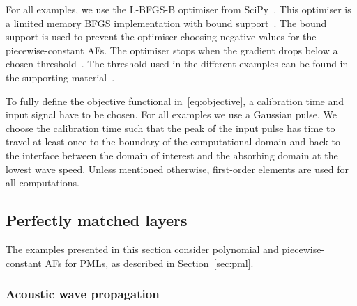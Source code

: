 \documentclass[a4paper]{article}
\begin{document}
For all examples, we use the L-BFGS-B optimiser from
SciPy~\citep{scipy}. This optimiser is a limited memory BFGS
implementation with bound support~\citep{byrd95etall}. The bound
support is used to prevent the optimiser choosing negative values for
the piecewise-constant AFs. The optimiser stops when the gradient
drops below a chosen threshold~\citep{nocedal00wright}. The threshold
used in the different examples can be found in the supporting
material~\citep{pmlcode}.

To fully define the objective functional in~\eqref{eq:objective}, a
calibration time and input signal have to be chosen. For all examples
we use a Gaussian pulse. We choose the calibration time such that the
peak of the input pulse has time to travel at least once to the
boundary of the computational domain and back to the interface between
the domain of interest and the absorbing domain at the lowest wave
speed. Unless mentioned otherwise, first-order elements are used for
all computations.

\subsection{Perfectly matched layers}
\label{sec:pmlresults}

The examples presented in this section consider polynomial and
piecewise-constant AFs for PMLs, as described in
Section~\ref{sec:pml}.

\subsubsection{Acoustic wave propagation}
\label{sec:acoustic}
\end{document}
